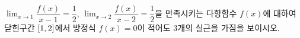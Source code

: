 $\displaystyle\lim_{x\to 1}\dfrac{f(x)}{x-1}=\dfrac{1}{2}$, $\displaystyle\lim_{x\to 2}\dfrac{f(x)}{x-2}=\dfrac{1}{2}$을 만족시키는 다항함수 $f(x)$에 대하여 닫힌구간 $[1{,}\mkern3mu\mathopen{}2]$에서 방정식 $f(x)=0$이 적어도 $3$개의 실근을 가짐을 보이시오.
